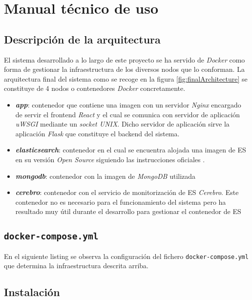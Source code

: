 \chapter{Manual técnico de uso}

\section{Descripción de la arquitectura}
El sistema desarrollado a lo largo de este proyecto se ha servido de \textit{Docker} como forma de gestionar la infraestructura de los diversos nodos que lo conforman. La arquitectura final del sistema como se recoge en la figura \ref{fig:finalArchitecture} se constituye de 4 nodos o contenedores \textit{Docker} concretamente.

\begin{itemize}
	\item \textit{\textbf{app}}: contenedor que contiene una imagen con un servidor \textit{Nginx} encargado de servir el \gls{frontend} \textit{React} y el cual se comunica con servidor de aplicación \textit{uWSGI} mediante un \textit{socket UNIX}. Dicho servidor de aplicación sirve la aplicación \textit{Flask} que constituye el \gls{backend} del sistema.
	\item \textit{\textbf{elasticsearch}}: contenedor en el cual se encuentra alojada una imagen de \acrlong{ES} en su versión \textit{Open Source} siguiendo las instrucciones oficiales \cite{ES_docker}.
	\item \textit{\textbf{mongodb}}: contenedor con la imagen de \textit{MongoDB} utilizada
	\item \textit{\textbf{cerebro}}: contenedor con el servicio de monitorización de \acrshort{ES} \textit{Cerebro}. Este contenedor no es necesario para el funcionamiento del sistema pero ha resultado muy útil durante el desarrollo para gestionar el contenedor de \acrshort{ES}
\end{itemize}

\section{\texttt{docker-compose.yml}}
En el siguiente listing se observa la configuración del fichero \texttt{docker-compose.yml} que determina la infraestructura descrita arriba.



\section{Instalación}
